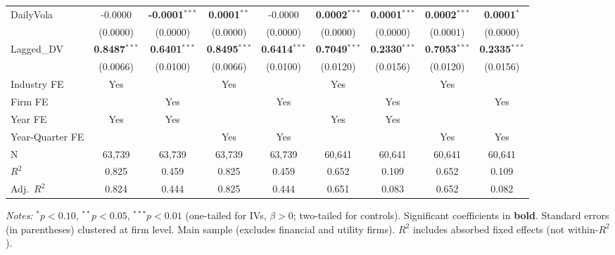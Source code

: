 \documentclass[11pt,a4paper]{article}
\begin{document}
\begin{table}[htbp]
\begin{tabular}{lcccccccc}
DailyVola & -0.0000 & \textbf{-0.0001}$^{***}$ & \textbf{0.0001}$^{**}$ & -0.0000 & \textbf{0.0002}$^{***}$ & \textbf{0.0001}$^{***}$ & \textbf{0.0002}$^{***}$ & \textbf{0.0001}$^{*}$ \\
 & (0.0000) & (0.0000) & (0.0000) & (0.0000) & (0.0000) & (0.0000) & (0.0001) & (0.0000) \\
Lagged\_DV & \textbf{0.8487}$^{***}$ & \textbf{0.6401}$^{***}$ & \textbf{0.8495}$^{***}$ & \textbf{0.6414}$^{***}$ & \textbf{0.7049}$^{***}$ & \textbf{0.2330}$^{***}$ & \textbf{0.7053}$^{***}$ & \textbf{0.2335}$^{***}$ \\
 & (0.0066) & (0.0100) & (0.0066) & (0.0100) & (0.0120) & (0.0156) & (0.0120) & (0.0156) \\
\midrule
Industry FE & Yes &  & Yes &  & Yes &  & Yes &  \\
Firm FE &  & Yes &  & Yes &  & Yes &  & Yes \\
Year FE & Yes & Yes &  &  & Yes & Yes &  &  \\
Year-Quarter FE &  &  & Yes & Yes &  &  & Yes & Yes \\
\midrule
N & 63,739 & 63,739 & 63,739 & 63,739 & 60,641 & 60,641 & 60,641 & 60,641 \\
$R^2$ & 0.825 & 0.459 & 0.825 & 0.459 & 0.652 & 0.109 & 0.652 & 0.109 \\
Adj.~$R^2$ & 0.824 & 0.444 & 0.825 & 0.444 & 0.651 & 0.083 & 0.652 & 0.082 \\
\bottomrule
\end{tabular}
\begin{minipage}{\linewidth}
\vspace{2pt}\scriptsize
\textit{Notes:} $^{*}p<0.10$, $^{**}p<0.05$, $^{***}p<0.01$ (one-tailed for IVs, $\beta > 0$; two-tailed for controls).
 Significant coefficients in \textbf{bold}.
 Standard errors (in parentheses) clustered at firm level.
 Main sample (excludes financial and utility firms).
 $R^2$ includes absorbed fixed effects (not within-$R^2$).
\end{minipage}
\end{table}
\clearpage
\end{document}
